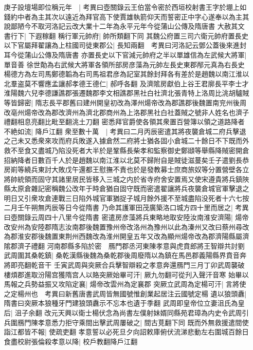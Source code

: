 庚子設壇場即位稱元年　|{
	考異曰壺關錄云王伯當令密於西垣校射書王字於堋上如錢約中者為主其次以遠近為拜官高下使賈雄執箭仰天而誓密正中字心遂奉以為主其說鄙陋今不取河洛記云改大業十二年為永平元年今從蒲山公傳及隋唐書}
大赦其文書行下|{
	下遐稼翻}
稱行軍元帥府|{
	帥所類翻下同}
其魏公府置三司六衛元帥府置長史以下官屬拜翟讓為上柱國司徒東郡公|{
	長知兩翻　考異曰河洛記云鄧公蓋後來進封耳今從蒲山公傳及隋唐書}
亦置長史以下官減元帥府之半以單雄信為左武候大將軍|{
	單音善}
徐世勣為右武候大將軍各領所部房彦藻為元帥左長史東郡邴元真為右長史楊德方為左司馬鄭德韜為右司馬祖君彦為記室其餘封拜各有差於是趙魏以南江淮以北羣盗莫不響應孟讓郝孝德王德仁|{
	郝呼各翻}
及濟隂房獻伯上谷王君廓長平李士才淮陽魏六兒李德謙譙郡張遷魏郡李文相譙郡黑社白社濟北張青特上洛周比洮胡驢賊等皆歸密|{
	隋志長平郡舊曰建州開皇初改為澤州煬帝改為郡譙郡後魏置南兖州後周改亳州煬帝改為郡改濟州為濟北郡商州為上洛郡黑社白社蓋賊之號非人姓名也濟子禮翻相息亮翻比毗至翻洮土刀翻}
密悉拜官爵使各領其衆置百營簿以領之道路降者不絶如流|{
	降戶江翻}
衆至數十萬　|{
	考異曰二月丙辰密遣其將夜襲倉城二府兵擊退之己未又悉衆來攻而府兵敗遂入據倉然二府將士猶各固小倉城二十餘日不下既而外救不至食又盡城乃陷没死者大半於是鞏縣長柴孝和監察御史鄭頲等舉縣降賊密開倉招納降者日數百千人於是趙魏以南江淮以北莫不歸附自是賊徒滋蔓矣壬子遣劉長恭房崱等繞兵東討大敗戊午還都王慰撫不責也於是發教募士庶商旅奴等分置營壁各立將帥統領而固守其諸里居民皆移入三城之内於省寺府舍安置焉又使宋遵貴將兵鎮陜縣太原倉雜記密稱魏公改年于時倉猶自固守既而密遣翟讓將兵夜襲倉城官軍擊退之明日又引衆攻倉連戰三日陷外城官軍猶捉子城月餘外援不至城盡陷没死者十六七按二月壬午朔無丙辰等日今從隋書}
乃命其護軍田茂廣築洛口城方四十里而居之|{
	考異曰壺關錄云周四十八里今從隋書}
密遣房彦藻將兵東略地取安陸汝南淮安濟陽|{
	煬帝改安州為安陸郡隋志汝南郡後魏置豫州帝改洛州為豫州以此為溱州又改曰蔡州尋改為郡淮安郡後魏置東荆州西魏改為淮州開皇五年又改為顯州煬帝改為郡濟陽縣屬濟隂郡濟子禮翻}
河南郡縣多陷於密　鴈門郡丞河東陳孝意與虎賁郎將王智辯共討劉武周圍其桑乾鎮|{
	桑乾漢縣後魏為桑乾郡後周廢隋以為鎮在馬邑郡義陽縣界賁音奔將即亮翻乾音干}
壬寅武周與突厥合兵擊智辯殺之孝意奔還鴈門三月丁卯武周襲破樓煩郡進取汾陽宫獲隋宫人以賂突厥始畢可汗|{
	厥九勿翻可從刋入聲汗音寒}
始畢以馬報之兵勢益振又攻陷定襄|{
	煬帝改雲州為定襄郡}
突厥立武周為定楊可汗|{
	言將使之定楊州也　考異曰新舊唐書武周皆無國號惟創業起居注云國號定楊}
遺以狼頭纛|{
	隋書曰突厥本狼種牙門建狼頭纛示不忘本也遺于季翻}
武周即皇帝位立妻沮氏為皇后|{
	沮子余翻}
改元天興以衛士楊伏念為尚書左僕射妹婿同縣苑君璋為内史令武周引兵圍鴈門陳孝意悉力拒守乘間出擊武周屢破之|{
	間古莧翻下同}
既而外無救援遣間使詣江都皆不報|{
	使疏吏翻}
孝意誓以必死旦夕向詔敕庫俯伏流涕悲動左右圍城百餘日食盡校尉張倫殺孝意以降|{
	校戶教翻降戶江翻}
